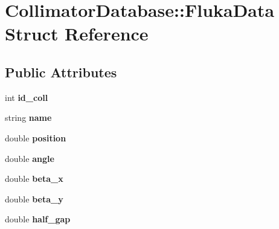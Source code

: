 \hypertarget{structCollimatorDatabase_1_1FlukaData}{}\section{Collimator\+Database\+:\+:Fluka\+Data Struct Reference}
\label{structCollimatorDatabase_1_1FlukaData}
\subsection*{Public Attributes}
\begin{DoxyCompactItemize}
\item 
\mbox{\label{structCollimatorDatabase_1_1FlukaData_a7661bc79bf46c5b3d66537e52072c892}} 
int {\bfseries id\+\_\+coll}
\item 
\mbox{\label{structCollimatorDatabase_1_1FlukaData_a838064f279a6f3f5570fed3eaf4c558e}} 
string {\bfseries name}
\item 
\mbox{\label{structCollimatorDatabase_1_1FlukaData_ae7e7c1ec9cc735b2322a9f15094ac369}} 
double {\bfseries position}
\item 
\mbox{\label{structCollimatorDatabase_1_1FlukaData_a692b53c22dcf3f581efadda85844223f}} 
double {\bfseries angle}
\item 
\mbox{\label{structCollimatorDatabase_1_1FlukaData_af0eea1e357d538bb9aafb2a552697f7a}} 
double {\bfseries beta\+\_\+x}
\item 
\mbox{\label{structCollimatorDatabase_1_1FlukaData_ab1e4d640c1021fd39b2064025d3b8ec0}} 
double {\bfseries beta\+\_\+y}
\item 
\mbox{\label{structCollimatorDatabase_1_1FlukaData_a99ee205d60a3bc44829e975c12e39324}} 
double {\bfseries half\+\_\+gap}
\item 
\mbox{\label{structCollimatorDatabase_1_1FlukaData_ac6fae4754575449917b085e42fca9775}} 

\end{DoxyCompactItemize}
